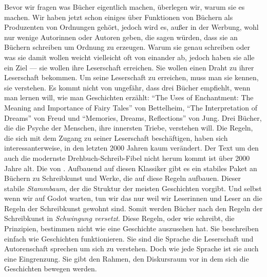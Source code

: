   Bevor wir fragen was Bücher eigentlich machen, überlegen wir, warum sie es
  machen. Wir haben jetzt schon einiges über Funktionen von Büchern als
  Produzenten von Ordnungen gehört, jedoch wird es, außer in der Werbung, wohl
  nur wenige Autorinnen oder Autoren geben, die sagen würden, dass sie an
  Büchern schreiben um Ordnung zu erzeugen. Warum sie genau schreiben oder was
  sie damit wollen weicht vielleicht oft von einander ab, jedoch haben sie alle
  ein Ziel --- sie wollen ihre Leserschaft erreichen. Sie wollen einen Draht zu
  ihrer Leserschaft bekommen. Um seine Leserschaft zu erreichen, muss man sie
  kennen, sie verstehen. Es kommt nicht von ungefähr, dass
   drei Bücher empfiehlt, wenn man lernen will, wie
  man Geschichten erzählt: \hyphenquote{english}{The Uses of Enchantment: The
  Meaning and Importance of Fairy Tales} von Bettelheim,
  \hyphenquote{english}{The Interpretation of Dreams} von Freud und
  \hyphenquote{english}{Memories, Dreams, Reflections} von Jung. Drei Bücher,
  die die Psyche der Menschen, ihre innersten Triebe, verstehen will. Die
  Regeln, die sich mit dem Zugang zu seiner Leserschaft beschäftigen, haben sich
  interessanterweise, in den letzten 2000 Jahren kaum verändert. Der Text um den
  auch die modernste Drehbuch-Schreib-Fibel nicht herum kommt ist über 2000
  Jahre alt. Die  von .
  Aufbauend auf diesen Klassiker gibt es ein stabiles Paket an Büchern zu
  Schreibkunst und Werke, die auf diese Regeln aufbauen. Dieser stabile
  \emph{Stammbaum}, der die Struktur der meisten Geschichten vorgibt. Und selbst
  wenn wir auf Godot warten, tun wir das nur weil wir Leserinnen und Leser an
  die Regeln der Schreibkunst gewohnt sind. Somit werden Bücher nach den Regeln
  der Schreibkunst in \emph{Schwingung versetzt}. Diese Regeln, oder wie
   schreibt, die Prinzipien, bestimmen nicht wie eine
  Geschichte auszusehen hat. Sie beschreiben einfach wie Geschichten
  funktionieren. Sie sind die Sprache die Leserschaft und Autorenschaft sprechen
  um sich zu verstehen. \parencite[30]{Daehnke2003} Doch wie jede Sprache ist
  sie auch eine Eingrenzung. Sie gibt den Rahmen, den Diskursraum vor in dem
  sich die Geschichten bewegen werden.


